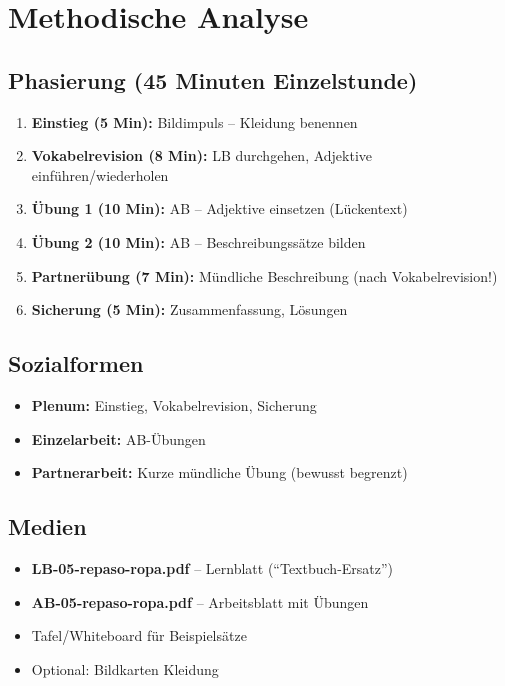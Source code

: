 \documentclass[11pt,a4paper]{article}
\begin{document}
\section{Methodische Analyse}

\subsection{Phasierung (45 Minuten Einzelstunde)}
\begin{enumerate}
    \item \textbf{Einstieg (5 Min):} Bildimpuls -- Kleidung benennen
    \item \textbf{Vokabelrevision (8 Min):} LB durchgehen, Adjektive einführen/wiederholen
    \item \textbf{Übung 1 (10 Min):} AB -- Adjektive einsetzen (Lückentext)
    \item \textbf{Übung 2 (10 Min):} AB -- Beschreibungssätze bilden
    \item \textbf{Partnerübung (7 Min):} Mündliche Beschreibung (nach Vokabelrevision!)
    \item \textbf{Sicherung (5 Min):} Zusammenfassung, Lösungen
\end{enumerate}

\subsection{Sozialformen}
\begin{itemize}
    \item \textbf{Plenum:} Einstieg, Vokabelrevision, Sicherung
    \item \textbf{Einzelarbeit:} AB-Übungen
    \item \textbf{Partnerarbeit:} Kurze mündliche Übung (bewusst begrenzt)
\end{itemize}

\subsection{Medien}
\begin{itemize}
    \item \textbf{LB-05-repaso-ropa.pdf} -- Lernblatt (``Textbuch-Ersatz'')
    \item \textbf{AB-05-repaso-ropa.pdf} -- Arbeitsblatt mit Übungen
    \item Tafel/Whiteboard für Beispielsätze
    \item Optional: Bildkarten Kleidung
\end{itemize}
\end{document}

